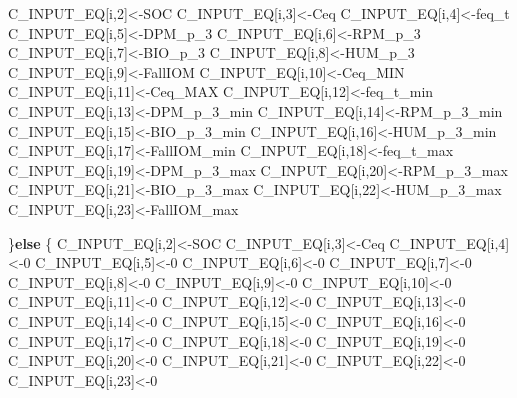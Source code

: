 \documentclass[
  10pt,
  b5paper,
]{book}
\newenvironment{Shaded}{\begin{snugshade}}{\end{snugshade}}
\newcommand{\ControlFlowTok}[1]{\textcolor[rgb]{0.13,0.29,0.53}{\textbf{#1}}}
\newcommand{\DecValTok}[1]{\textcolor[rgb]{0.00,0.00,0.81}{#1}}
\newcommand{\NormalTok}[1]{#1}
\begin{document}
\begin{Shaded}
\begin{Highlighting}[]
{\NormalTok{C_INPUT_EQ[i,}\DecValTok{2}\NormalTok{]<-SOC}
\NormalTok{C_INPUT_EQ[i,}\DecValTok{3}\NormalTok{]<-Ceq}
\NormalTok{C_INPUT_EQ[i,}\DecValTok{4}\NormalTok{]<-feq_t}
\NormalTok{C_INPUT_EQ[i,}\DecValTok{5}\NormalTok{]<-DPM_p_}\DecValTok{3}
\NormalTok{C_INPUT_EQ[i,}\DecValTok{6}\NormalTok{]<-RPM_p_}\DecValTok{3}
\NormalTok{C_INPUT_EQ[i,}\DecValTok{7}\NormalTok{]<-BIO_p_}\DecValTok{3}
\NormalTok{C_INPUT_EQ[i,}\DecValTok{8}\NormalTok{]<-HUM_p_}\DecValTok{3}
\NormalTok{C_INPUT_EQ[i,}\DecValTok{9}\NormalTok{]<-FallIOM}
\NormalTok{C_INPUT_EQ[i,}\DecValTok{10}\NormalTok{]<-Ceq_MIN}
\NormalTok{C_INPUT_EQ[i,}\DecValTok{11}\NormalTok{]<-Ceq_MAX}
\NormalTok{C_INPUT_EQ[i,}\DecValTok{12}\NormalTok{]<-feq_t_min}
\NormalTok{C_INPUT_EQ[i,}\DecValTok{13}\NormalTok{]<-DPM_p_}\DecValTok{3}\NormalTok{_min}
\NormalTok{C_INPUT_EQ[i,}\DecValTok{14}\NormalTok{]<-RPM_p_}\DecValTok{3}\NormalTok{_min}
\NormalTok{C_INPUT_EQ[i,}\DecValTok{15}\NormalTok{]<-BIO_p_}\DecValTok{3}\NormalTok{_min}
\NormalTok{C_INPUT_EQ[i,}\DecValTok{16}\NormalTok{]<-HUM_p_}\DecValTok{3}\NormalTok{_min}
\NormalTok{C_INPUT_EQ[i,}\DecValTok{17}\NormalTok{]<-FallIOM_min}
\NormalTok{C_INPUT_EQ[i,}\DecValTok{18}\NormalTok{]<-feq_t_max}
\NormalTok{C_INPUT_EQ[i,}\DecValTok{19}\NormalTok{]<-DPM_p_}\DecValTok{3}\NormalTok{_max}
\NormalTok{C_INPUT_EQ[i,}\DecValTok{20}\NormalTok{]<-RPM_p_}\DecValTok{3}\NormalTok{_max}
\NormalTok{C_INPUT_EQ[i,}\DecValTok{21}\NormalTok{]<-BIO_p_}\DecValTok{3}\NormalTok{_max}
\NormalTok{C_INPUT_EQ[i,}\DecValTok{22}\NormalTok{]<-HUM_p_}\DecValTok{3}\NormalTok{_max}
\NormalTok{C_INPUT_EQ[i,}\DecValTok{23}\NormalTok{]<-FallIOM_max}

\NormalTok{\}}\ControlFlowTok{else}\NormalTok{ \{}
\NormalTok{C_INPUT_EQ[i,}\DecValTok{2}\NormalTok{]<-SOC}
\NormalTok{C_INPUT_EQ[i,}\DecValTok{3}\NormalTok{]<-Ceq}
\NormalTok{C_INPUT_EQ[i,}\DecValTok{4}\NormalTok{]<-}\DecValTok{0}
\NormalTok{C_INPUT_EQ[i,}\DecValTok{5}\NormalTok{]<-}\DecValTok{0}
\NormalTok{C_INPUT_EQ[i,}\DecValTok{6}\NormalTok{]<-}\DecValTok{0}
\NormalTok{C_INPUT_EQ[i,}\DecValTok{7}\NormalTok{]<-}\DecValTok{0}
\NormalTok{C_INPUT_EQ[i,}\DecValTok{8}\NormalTok{]<-}\DecValTok{0}
\NormalTok{C_INPUT_EQ[i,}\DecValTok{9}\NormalTok{]<-}\DecValTok{0}
\NormalTok{C_INPUT_EQ[i,}\DecValTok{10}\NormalTok{]<-}\DecValTok{0}
\NormalTok{C_INPUT_EQ[i,}\DecValTok{11}\NormalTok{]<-}\DecValTok{0}
\NormalTok{C_INPUT_EQ[i,}\DecValTok{12}\NormalTok{]<-}\DecValTok{0}
\NormalTok{C_INPUT_EQ[i,}\DecValTok{13}\NormalTok{]<-}\DecValTok{0}
\NormalTok{C_INPUT_EQ[i,}\DecValTok{14}\NormalTok{]<-}\DecValTok{0}
\NormalTok{C_INPUT_EQ[i,}\DecValTok{15}\NormalTok{]<-}\DecValTok{0}
\NormalTok{C_INPUT_EQ[i,}\DecValTok{16}\NormalTok{]<-}\DecValTok{0}
\NormalTok{C_INPUT_EQ[i,}\DecValTok{17}\NormalTok{]<-}\DecValTok{0}
\NormalTok{C_INPUT_EQ[i,}\DecValTok{18}\NormalTok{]<-}\DecValTok{0}
\NormalTok{C_INPUT_EQ[i,}\DecValTok{19}\NormalTok{]<-}\DecValTok{0}
\NormalTok{C_INPUT_EQ[i,}\DecValTok{20}\NormalTok{]<-}\DecValTok{0}
\NormalTok{C_INPUT_EQ[i,}\DecValTok{21}\NormalTok{]<-}\DecValTok{0}
\NormalTok{C_INPUT_EQ[i,}\DecValTok{22}\NormalTok{]<-}\DecValTok{0}
\NormalTok{C_INPUT_EQ[i,}\DecValTok{23}\NormalTok{]<-}\DecValTok{0}

}
\end{Highlighting}
\end{Shaded}
\end{document}
